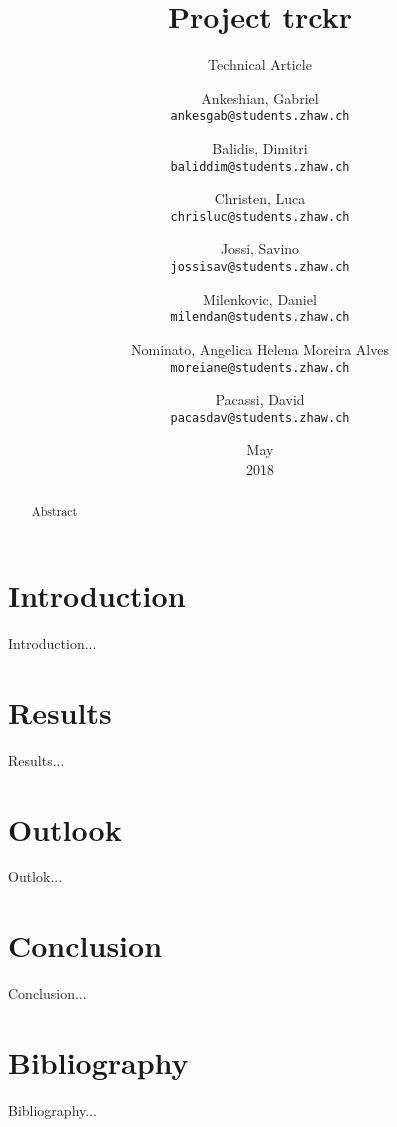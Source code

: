 \documentclass[a4paper, 12pt, headsepline]{scrartcl}
\title{Project trckr}
\subtitle{Technical Article}
\date{May \\ 2018}
\author{
    Ankeshian, Gabriel\\
    \texttt{ankesgab@students.zhaw.ch}
    \and
    Balidis, Dimitri\\
    \texttt{baliddim@students.zhaw.ch}
    \and
    Christen, Luca\\
    \texttt{chrisluc@students.zhaw.ch}
    \and
    Jossi, Savino\\
    \texttt{jossisav@students.zhaw.ch}
    \and
    Milenkovic, Daniel\\
    \texttt{milendan@students.zhaw.ch}
    \and
    Nominato, Angelica Helena Moreira Alves\\
    \texttt{moreiane@students.zhaw.ch}
    \and
    Pacassi, David\\
    \texttt{pacasdav@students.zhaw.ch}}
\begin{document}
\maketitle
\pagebreak

\begin{abstract}
    Abstract
\end{abstract}


\tableofcontents

\section{Introduction}
Introduction...

\section{Results}
Results...

\section{Outlook}
Outlok...

\section{Conclusion}
Conclusion...

\section{Bibliography}
Bibliography...
\end{document}
